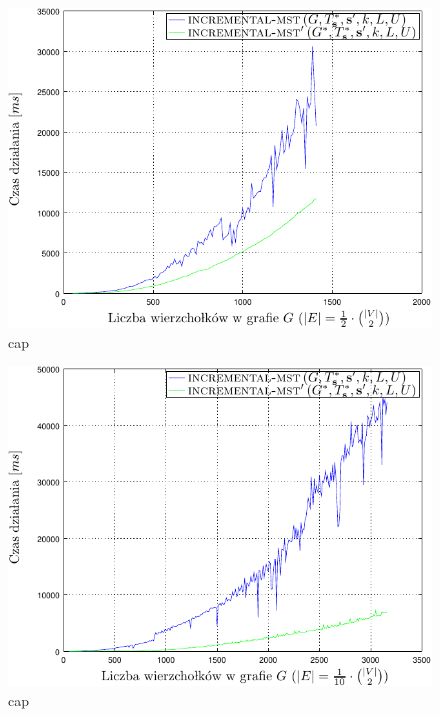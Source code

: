 \begin{figure}[!htbp]
	\includegraphics[width=\textwidth]{Chapter_VI/IMST2-example/IMST2_psfrag}
	\caption{
		cap
	}
	\label{fig:imst2}
\end{figure}

\begin{figure}[!htbp]
	\includegraphics[width=\textwidth]{Chapter_VI/IMST3-example/IMST3_psfrag}
	\caption{
		cap
	}
	\label{fig:imst3}
\end{figure}


